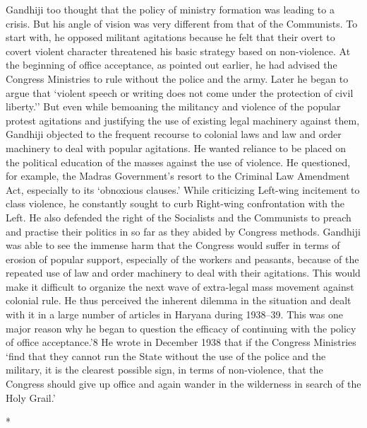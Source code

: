 Gandhiji too thought that the policy of ministry formation was leading to a crisis. But his angle of vision was very different from that of the Communists. To start with, he opposed militant agitations because he felt that their overt to covert violent character threatened his basic strategy based on non-violence. At the beginning of office acceptance, as pointed out earlier, he had advised the Congress Ministries to rule without the police and the army. Later he began to argue that `violent speech or writing does not come under the protection of civil liberty.'' But even while bemoaning the militancy and violence of the popular protest agitations and justifying the use of existing legal machinery against them, Gandhiji objected to the frequent recourse to colonial laws and law and order machinery to deal with popular agitations. He wanted reliance to be placed on the political education of the masses against the use of violence. He questioned, for example, the Madras Government's resort to the Criminal Law Amendment Act, especially to its `obnoxious clauses.' While criticizing Left-wing incitement to class violence, he constantly sought to curb Right-wing confrontation with the Left. He also defended the right of the Socialists and the Communists to preach and practise their politics in so far as they abided by Congress methods. Gandhiji was able to see the immense harm that the Congress would suffer in terms of erosion of popular support, especially of the workers and peasants, because of the repeated use of law and order machinery to deal with their agitations. This would make it difficult to organize the next wave of extra-legal mass movement against colonial rule. He thus perceived the inherent dilemma in the situation and dealt with it in a large number of articles in Haryana during 1938--39. This was one major reason why he began to question the efficacy of continuing with the policy of office acceptance.'8 He wrote in December 1938 that if the Congress Ministries `find that they cannot run the State without the use of the police and the military, it is the clearest possible sign, in terms of non-violence, that the Congress should give up office and again wander in the wilderness in search of the Holy Grail.'

\begin{center}*\end{center}

\paragraph*{}

